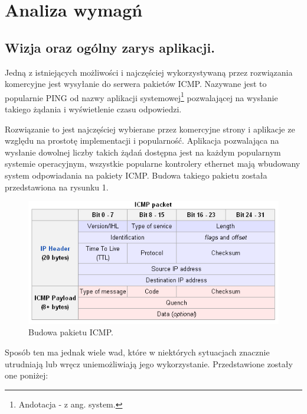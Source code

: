 \chapter[Analiza wymagań.]{Analiza wymagń}

\section{Wizja oraz ogólny zarys aplikacji.}

Jedną z istniejących możliwości i najczęściej wykorzystywaną przez rozwiązania komercyjne jest wysyłanie do serwera pakietów ICMP. Nazywane jest to popularnie PING od nazwy aplikacji systemowej\footnote{Andotacja - z ang. system.} pozwalającej na wysłanie takiego żądania i wyświetlenie czasu odpowiedzi.

Rozwiązanie to jest najczęściej wybierane przez komercyjne strony i aplikacje ze względu na prostotę implementacji i popularność. Aplikacja pozwalająca na wysłanie dowolnej liczby takich żądań dostępna jest na każdym popularnym systemie operacyjnym, wszystkie popularne kontrolery ethernet mają wbudowany system odpowiadania na pakiety ICMP. Budowa takiego pakietu została przedstawiona na rysunku 1. 

\begin{figure}[H]
	\centering
	\includegraphics[width=\textwidth, bb = 0px 0px 535px 262px, keepaspectratio=true]{grafika/icmp_packet.jpg} 
	\caption{ Budowa pakietu ICMP. }
\end{figure}

Sposób ten ma jednak wiele wad, które w niektórych sytuacjach znacznie utrudniają lub wręcz uniemożliwiają jego wykorzystanie. Przedstawione zostały one poniżej:

